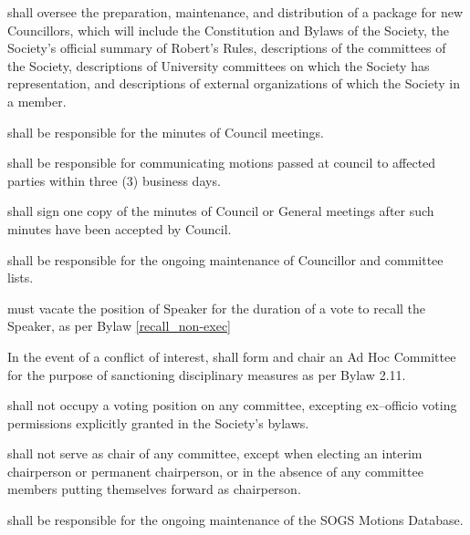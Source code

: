 \begin{longenum}[ label*=\thesubsection.\arabic*., align=left]
    \item shall oversee the preparation, maintenance, and distribution of a package for new Councillors, which will include the Constitution and Bylaws of the Society, the Society's official summary of Robert's Rules, descriptions of the committees of the Society, descriptions of University committees on which the Society has representation, and descriptions of external organizations of which the Society in a member.
    \item shall be responsible for the minutes of Council meetings.
    \item shall be responsible for communicating motions passed at council to affected parties within three (3) business days. 
    \item shall sign one copy of the minutes of Council or General meetings after such minutes have been accepted by Council.
    \item shall be responsible for the ongoing maintenance of Councillor and committee lists.
    \item must vacate the position of Speaker for the duration of a vote to recall the Speaker, as per Bylaw \ref{recall_non-exec}
    \item In the event of a conflict of interest, shall form and chair an Ad Hoc Committee for the purpose of sanctioning disciplinary measures as per Bylaw 2.11.
     \item shall not occupy a voting position on any committee, excepting ex--officio voting permissions explicitly granted in the Society's bylaws.
	\item shall not serve as chair of any committee, except when electing an interim chairperson or permanent chairperson, or in the absence of any committee members putting themselves forward as chairperson.
    \item shall be responsible for the ongoing maintenance of the SOGS Motions Database.
\end{longenum}

